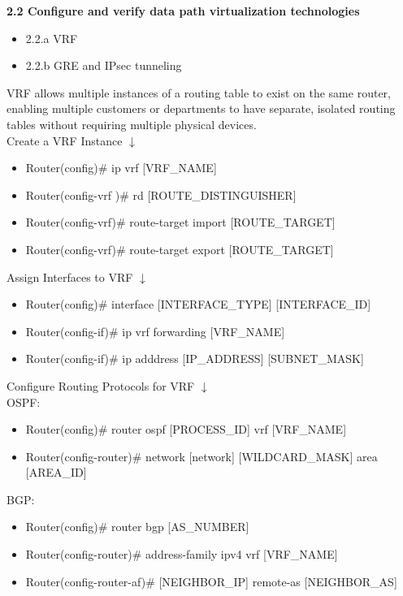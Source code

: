 \documentclass{article}
\begin{document}
\textbf{2.2 Configure and verify data path virtualization technologies}
\begin{itemize}
\item 2.2.a VRF
\item 2.2.b GRE and IPsec tunneling
\end{itemize}

	VRF allows multiple instances of a routing table to exist on the same router, enabling multiple customers or departments to have separate, isolated routing tables without requiring multiple physical devices.\\

Create a VRF Instance $\downarrow$
\begin{itemize}
\item Router(config)\# ip vrf [VRF\_NAME]
\item Router(config-vrf )\# rd [ROUTE\_DISTINGUISHER]
\item Router(config-vrf)\# route-target import [ROUTE\_TARGET]
\item Router(config-vrf)\# route-target export [ROUTE\_TARGET]  
\end{itemize}

Assign Interfaces to VRF $\downarrow$
\begin{itemize}
\item Router(config)\# interface [INTERFACE\_TYPE] [INTERFACE\_ID]
\item Router(config-if)\# ip vrf forwarding [VRF\_NAME]
\item Router(config-if)\# ip adddress [IP\_ADDRESS] [SUBNET\_MASK]
\end{itemize}

Configure Routing Protocols for VRF $\downarrow$\\

\noindent OSPF:
\begin{itemize}
\item Router(config)\# router ospf [PROCESS\_ID] vrf [VRF\_NAME]
\item Router(config-router)\# network [network] [WILDCARD\_MASK] area [AREA\_ID]
\end{itemize}
BGP:
\begin{itemize} 
\item Router(config)\# router bgp [AS\_NUMBER]
\item Router(config-router)\# address-family ipv4 vrf [VRF\_NAME]
\item Router(config-router-af)\# [NEIGHBOR\_IP] remote-as [NEIGHBOR\_AS]
\end{itemize}
\end{document}
